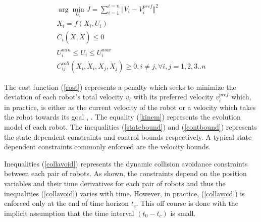 \documentclass[letterpaper, 10 pt, conference]{IEEEtran}  %
\begin{document}
\begin{eqnarray}
\arg\min_{U_i} J =  \sum_{i=1}^{i=n}\Vert V_i-V_i^{pref}\Vert^2 \label{cost}\\ 
 {X}_i = f(X_i, U_i)\label{kinem}\\
C_i(X,\dot{X})\leq 0\label{statebound}\\
U_i^{min}\leq U_i\leq U_{i}^{max}\label{contbound}\\
C_{ij}^{coll}(X_i, \dot{X}_i, X_j, \dot{X}_j)\geq 0, i\neq j, \forall i,j={1,2,3..n} \label{collavoid}
\end{eqnarray}



%
%
%

%


The cost function (\ref{cost}) represents a penalty which seeks to minimize the deviation of each robot's total velocity $v_i$ with its preferred velocity  $v_i^{pref}$ which, in practice,  is either as the current velocity of the robot or a velocity which takes the robot towards its goal \cite{avo}, \cite{motion_cont}. The equality (\ref{kinem}) represents the evolution model of each robot. The inequalities (\ref{statebound}) and (\ref{contbound}) represents the state dependent constraints and control bounds respectively. A typical state dependent constraints commonly enforced are the velocity bounds. 


Inequalities (\ref{collavoid}) represents the dynamic collision avoidance constraints between each pair of robots. As shown, the constraints depend on the position variables and their time derivatives for each pair of robots and thus the inequalities (\ref{collavoid}) varies with time. However, in practice, (\ref{collavoid}) is enforced only at the end of time horizon $t_c$. This off course is done with the implicit assumption that the time interval $(t_0-t_c)$ is small.
\end{document}
